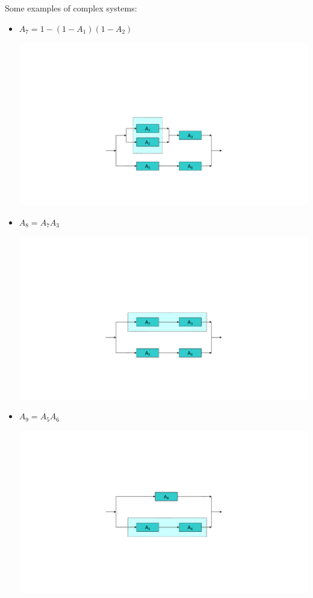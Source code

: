 \begin{examplebox}
    Some examples of complex systems:
    \begin{itemize}
        \item $A_{7} = 1 - \left(1-A_{1}\right)\left(1-A_{2}\right)$
        \begin{center}
            \includegraphics[width=.8\textwidth]{img/availability-in-parallel-1.pdf}
        \end{center}

        \item $A_{8} = A_{7}A_{3}$
        \begin{center}
            \includegraphics[width=.8\textwidth]{img/availability-in-parallel-2.pdf}
        \end{center}

        \item $A_{9} = A_{5}A_{6}$
        \begin{center}
            \includegraphics[width=.8\textwidth]{img/availability-in-parallel-3.pdf}
        \end{center}
        

\end{itemize}
\end{examplebox}
